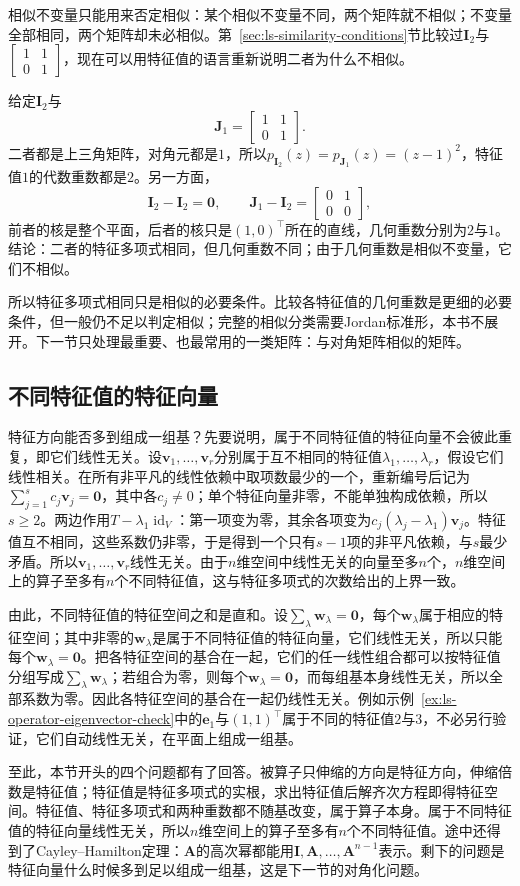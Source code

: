 相似不变量只能用来否定相似：某个相似不变量不同，两个矩阵就不相似；不变量全部相同，两个矩阵却未必相似。第~\ref{sec:ls-similarity-conditions}节比较过$\bm I_2$与$\left[\begin{smallmatrix}1&1\\0&1\end{smallmatrix}\right]$，现在可以用特征值的语言重新说明二者为什么不相似。
\begin{example}[反例：特征多项式相同而不相似]
\label{ex:ls-same-charpoly-not-similar}
给定$\bm I_2$与
\[
 \bm J_1=\begin{bmatrix}1&1\\0&1\end{bmatrix}.
\]
二者都是上三角矩阵，对角元都是$1$，所以$p_{\bm I_2}(z)=p_{\bm J_1}(z)=(z-1)^2$，特征值$1$的代数重数都是$2$。另一方面，
\[
 \bm I_2-\bm I_2=\bm0,\qquad
 \bm J_1-\bm I_2=\begin{bmatrix}0&1\\0&0\end{bmatrix},
\]
前者的核是整个平面，后者的核只是$(1,0)^{\top}$所在的直线，几何重数分别为$2$与$1$。结论：二者的特征多项式相同，但几何重数不同；由于几何重数是相似不变量，它们不相似。
\end{example}
所以特征多项式相同只是相似的必要条件。比较各特征值的几何重数是更细的必要条件，但一般仍不足以判定相似；完整的相似分类需要Jordan标准形，本书不展开。下一节只处理最重要、也最常用的一类矩阵：与对角矩阵相似的矩阵。

\subsection{不同特征值的特征向量}
\label{sec:ls-eigenvector-independence}

特征方向能否多到组成一组基？先要说明，属于不同特征值的特征向量不会彼此重复，即它们线性无关。设$\bm v_1,\ldots,\bm v_r$分别属于互不相同的特征值$\lambda_1,\ldots,\lambda_r$，假设它们线性相关。在所有非平凡的线性依赖中取项数最少的一个，重新编号后记为$\sum_{j=1}^s c_j\bm v_j=\bm0$，其中各$c_j\neq0$；单个特征向量非零，不能单独构成依赖，所以$s\geq2$。两边作用$T-\lambda_1\operatorname{id}_V$：第一项变为零，其余各项变为$c_j(\lambda_j-\lambda_1)\bm v_j$。特征值互不相同，这些系数仍非零，于是得到一个只有$s-1$项的非平凡依赖，与$s$最少矛盾。所以$\bm v_1,\ldots,\bm v_r$线性无关。由于$n$维空间中线性无关的向量至多$n$个，$n$维空间上的算子至多有$n$个不同特征值，这与特征多项式的次数给出的上界一致。

由此，不同特征值的特征空间之和是直和。设$\sum_\lambda\bm w_\lambda=\bm0$，每个$\bm w_\lambda$属于相应的特征空间；其中非零的$\bm w_\lambda$是属于不同特征值的特征向量，它们线性无关，所以只能每个$\bm w_\lambda=\bm0$。把各特征空间的基合在一起，它们的任一线性组合都可以按特征值分组写成$\sum_\lambda\bm w_\lambda$；若组合为零，则每个$\bm w_\lambda=\bm0$，而每组基本身线性无关，所以全部系数为零。因此各特征空间的基合在一起仍线性无关。例如示例~\ref{ex:ls-operator-eigenvector-check}中的$\bm e_1$与$(1,1)^{\top}$属于不同的特征值$2$与$3$，不必另行验证，它们自动线性无关，在平面上组成一组基。

至此，本节开头的四个问题都有了回答。被算子只伸缩的方向是特征方向，伸缩倍数是特征值；特征值是特征多项式的实根，求出特征值后解齐次方程即得特征空间。特征值、特征多项式和两种重数都不随基改变，属于算子本身。属于不同特征值的特征向量线性无关，所以$n$维空间上的算子至多有$n$个不同特征值。途中还得到了Cayley--Hamilton定理：$\bm A$的高次幂都能用$\bm I,\bm A,\ldots,\bm A^{n-1}$表示。剩下的问题是特征向量什么时候多到足以组成一组基，这是下一节的对角化问题。
